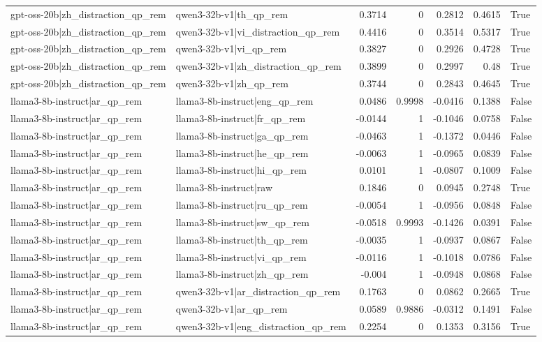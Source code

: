 \begin{table}
\begin{tabular}{l l r r r r l}
gpt-oss-20b|zh_distraction_qp_rem & qwen3-32b-v1|th_qp_rem & 0.3714 & 0 & 0.2812 & 0.4615 & True \\
gpt-oss-20b|zh_distraction_qp_rem & qwen3-32b-v1|vi_distraction_qp_rem & 0.4416 & 0 & 0.3514 & 0.5317 & True \\
gpt-oss-20b|zh_distraction_qp_rem & qwen3-32b-v1|vi_qp_rem & 0.3827 & 0 & 0.2926 & 0.4728 & True \\
gpt-oss-20b|zh_distraction_qp_rem & qwen3-32b-v1|zh_distraction_qp_rem & 0.3899 & 0 & 0.2997 & 0.48 & True \\
gpt-oss-20b|zh_distraction_qp_rem & qwen3-32b-v1|zh_qp_rem & 0.3744 & 0 & 0.2843 & 0.4645 & True \\
llama3-8b-instruct|ar_qp_rem & llama3-8b-instruct|eng_qp_rem & 0.0486 & 0.9998 & -0.0416 & 0.1388 & False \\
llama3-8b-instruct|ar_qp_rem & llama3-8b-instruct|fr_qp_rem & -0.0144 & 1 & -0.1046 & 0.0758 & False \\
llama3-8b-instruct|ar_qp_rem & llama3-8b-instruct|ga_qp_rem & -0.0463 & 1 & -0.1372 & 0.0446 & False \\
llama3-8b-instruct|ar_qp_rem & llama3-8b-instruct|he_qp_rem & -0.0063 & 1 & -0.0965 & 0.0839 & False \\
llama3-8b-instruct|ar_qp_rem & llama3-8b-instruct|hi_qp_rem & 0.0101 & 1 & -0.0807 & 0.1009 & False \\
llama3-8b-instruct|ar_qp_rem & llama3-8b-instruct|raw & 0.1846 & 0 & 0.0945 & 0.2748 & True \\
llama3-8b-instruct|ar_qp_rem & llama3-8b-instruct|ru_qp_rem & -0.0054 & 1 & -0.0956 & 0.0848 & False \\
llama3-8b-instruct|ar_qp_rem & llama3-8b-instruct|sw_qp_rem & -0.0518 & 0.9993 & -0.1426 & 0.0391 & False \\
llama3-8b-instruct|ar_qp_rem & llama3-8b-instruct|th_qp_rem & -0.0035 & 1 & -0.0937 & 0.0867 & False \\
llama3-8b-instruct|ar_qp_rem & llama3-8b-instruct|vi_qp_rem & -0.0116 & 1 & -0.1018 & 0.0786 & False \\
llama3-8b-instruct|ar_qp_rem & llama3-8b-instruct|zh_qp_rem & -0.004 & 1 & -0.0948 & 0.0868 & False \\
llama3-8b-instruct|ar_qp_rem & qwen3-32b-v1|ar_distraction_qp_rem & 0.1763 & 0 & 0.0862 & 0.2665 & True \\
llama3-8b-instruct|ar_qp_rem & qwen3-32b-v1|ar_qp_rem & 0.0589 & 0.9886 & -0.0312 & 0.1491 & False \\
llama3-8b-instruct|ar_qp_rem & qwen3-32b-v1|eng_distraction_qp_rem & 0.2254 & 0 & 0.1353 & 0.3156 & True \\

\end{tabular}
\end{table}
